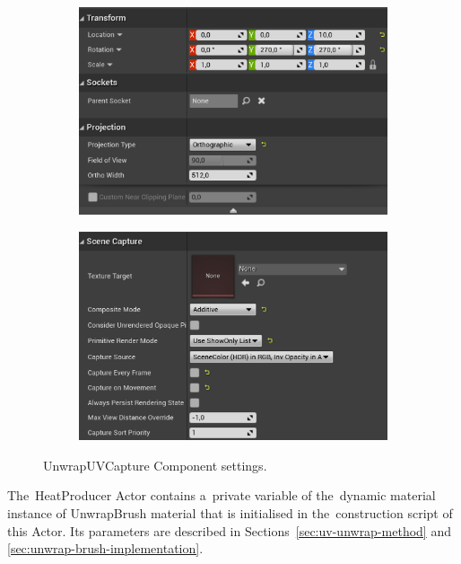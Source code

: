 \begin{figure}[!ht]\centering
    \begin{subfigure}[b]{0.495\textwidth}
        \centering
        \includegraphics[width=\textwidth]{img/capture-component-settings.png}
    \end{subfigure}
    \hfill
    \begin{subfigure}[b]{0.495\textwidth}
        \centering
        \includegraphics[width=\textwidth]{img/scene-capture-settings.png}
    \end{subfigure}
    \caption{UnwrapUVCapture Component settings.}
    \label{fig:capture-component-settings}
\end{figure}

\pagebreak{}

The~HeatProducer Actor contains a~private variable of the~dynamic material instance of UnwrapBrush material that is initialised in the~construction script of this Actor. Its parameters are described in Sections~\ref{sec:uv-unwrap-method} and \ref{sec:unwrap-brush-implementation}.

